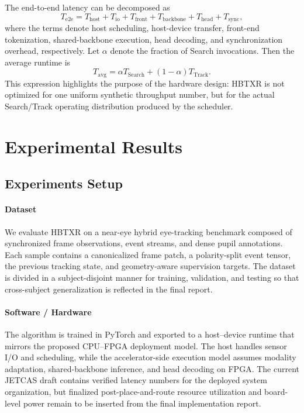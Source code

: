\documentclass[journal]{IEEEtran}
\begin{document}
The end-to-end latency can be decomposed as
\begin{equation}
T_{\mathrm{e2e}} = T_{\mathrm{host}} + T_{\mathrm{io}} + T_{\mathrm{front}} + T_{\mathrm{backbone}} + T_{\mathrm{head}} + T_{\mathrm{sync}},
\end{equation}
where the terms denote host scheduling, host-device transfer, front-end tokenization, shared-backbone execution, head decoding, and synchronization overhead, respectively. Let $\alpha$ denote the fraction of Search invocations. Then the average runtime is
\begin{equation}
T_{\mathrm{avg}} = \alpha T_{\mathrm{Search}} + (1-\alpha)T_{\mathrm{Track}}.
\end{equation}
This expression highlights the purpose of the hardware design: HBTXR is not optimized for one uniform synthetic throughput number, but for the actual Search/Track operating distribution produced by the scheduler.



\section{Experimental Results}
\subsection{Experiments Setup}
\paragraph*{Dataset}
We evaluate HBTXR on a near-eye hybrid eye-tracking benchmark composed of synchronized frame observations, event streams, and dense pupil annotations. Each sample contains a canonicalized frame patch, a polarity-split event tensor, the previous tracking state, and geometry-aware supervision targets. The dataset is divided in a subject-disjoint manner for training, validation, and testing so that cross-subject generalization is reflected in the final report.

\paragraph*{Software / Hardware}
The algorithm is trained in PyTorch and exported to a host--device runtime that mirrors the proposed CPU--FPGA deployment model. The host handles sensor I/O and scheduling, while the accelerator-side execution model assumes modality adaptation, shared-backbone inference, and head decoding on FPGA. The current JETCAS draft contains verified latency numbers for the deployed system organization, but finalized post-place-and-route resource utilization and board-level power remain to be inserted from the final implementation report.
\end{document}
